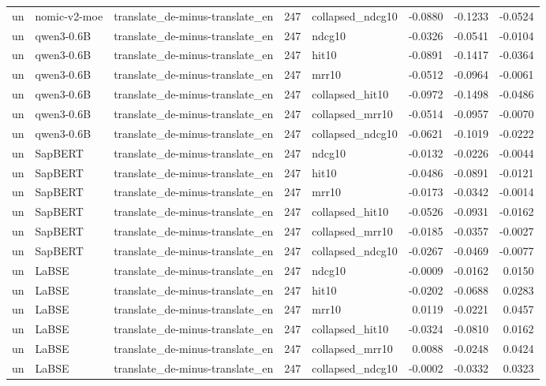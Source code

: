 \begin{tabular}{lllrlrrr}
un & nomic-v2-moe & translate\_de-minus-translate\_en & 247 & collapsed\_ndcg10 & -0.0880 & -0.1233 & -0.0524 \\
un & qwen3-0.6B & translate\_de-minus-translate\_en & 247 & ndcg10 & -0.0326 & -0.0541 & -0.0104 \\
un & qwen3-0.6B & translate\_de-minus-translate\_en & 247 & hit10 & -0.0891 & -0.1417 & -0.0364 \\
un & qwen3-0.6B & translate\_de-minus-translate\_en & 247 & mrr10 & -0.0512 & -0.0964 & -0.0061 \\
un & qwen3-0.6B & translate\_de-minus-translate\_en & 247 & collapsed\_hit10 & -0.0972 & -0.1498 & -0.0486 \\
un & qwen3-0.6B & translate\_de-minus-translate\_en & 247 & collapsed\_mrr10 & -0.0514 & -0.0957 & -0.0070 \\
un & qwen3-0.6B & translate\_de-minus-translate\_en & 247 & collapsed\_ndcg10 & -0.0621 & -0.1019 & -0.0222 \\
un & SapBERT & translate\_de-minus-translate\_en & 247 & ndcg10 & -0.0132 & -0.0226 & -0.0044 \\
un & SapBERT & translate\_de-minus-translate\_en & 247 & hit10 & -0.0486 & -0.0891 & -0.0121 \\
un & SapBERT & translate\_de-minus-translate\_en & 247 & mrr10 & -0.0173 & -0.0342 & -0.0014 \\
un & SapBERT & translate\_de-minus-translate\_en & 247 & collapsed\_hit10 & -0.0526 & -0.0931 & -0.0162 \\
un & SapBERT & translate\_de-minus-translate\_en & 247 & collapsed\_mrr10 & -0.0185 & -0.0357 & -0.0027 \\
un & SapBERT & translate\_de-minus-translate\_en & 247 & collapsed\_ndcg10 & -0.0267 & -0.0469 & -0.0077 \\
un & LaBSE & translate\_de-minus-translate\_en & 247 & ndcg10 & -0.0009 & -0.0162 & 0.0150 \\
un & LaBSE & translate\_de-minus-translate\_en & 247 & hit10 & -0.0202 & -0.0688 & 0.0283 \\
un & LaBSE & translate\_de-minus-translate\_en & 247 & mrr10 & 0.0119 & -0.0221 & 0.0457 \\
un & LaBSE & translate\_de-minus-translate\_en & 247 & collapsed\_hit10 & -0.0324 & -0.0810 & 0.0162 \\
un & LaBSE & translate\_de-minus-translate\_en & 247 & collapsed\_mrr10 & 0.0088 & -0.0248 & 0.0424 \\
un & LaBSE & translate\_de-minus-translate\_en & 247 & collapsed\_ndcg10 & -0.0002 & -0.0332 & 0.0323 \\

\end{tabular}
